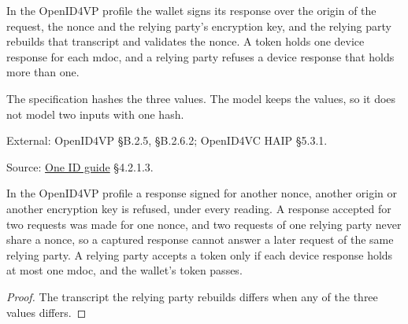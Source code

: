 \begin{definition}
  \label{def:openid4vp-binding}
  In the OpenID4VP profile the wallet signs its response over the origin of the
  request, the nonce and the relying party's encryption key, and the relying
  party rebuilds that transcript and validates the nonce.  A token holds one
  device response for each mdoc, and a relying party refuses a device response
  that holds more than one.

  The specification hashes the three values.  The model keeps the values, so it
  does not model two inputs with one hash.

  External: OpenID4VP §B.2.5, §B.2.6.2; OpenID4VC HAIP §5.3.1.

  Source: \href{https://standards.atlassian.net/wiki/spaces/OneID/pages/2947416082/Technical+Implementation+Guide}{One ID guide} §4.2.1.3.
\end{definition}

\begin{theorem}
  \label{thm:openid4vp-refuses-other-request}
  In the OpenID4VP profile a response signed for another nonce, another origin
  or another encryption key is refused, under every reading.  A response
  accepted for two requests was made for one nonce, and two requests of one
  relying party never share a nonce, so a captured response cannot answer a
  later request of the same relying party.  A relying party accepts a token
  only if each device response holds at most one mdoc, and the wallet's token
  passes.
\end{theorem}
\begin{proof}
  The transcript the relying party rebuilds differs when any of the three values differs.
\end{proof}

